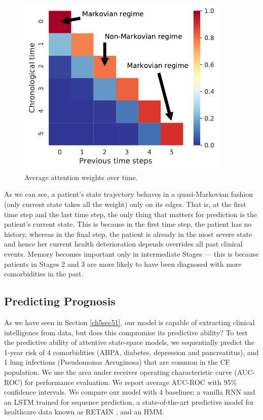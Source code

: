 \documentclass [PhD] {uclathes}
\begin{document}
\begin{figure}
\centering
\includegraphics[width=4in]{ch5Fig6.pdf}
\caption{Average attention weights over time.}
\label{ch5fig6}
\end{figure}

As we can see, a patient's state trajectory behaves in a quasi-Markovian fashion (only current state takes all the weight) only on its edges. That is, at the first time step and the last time step, the only thing that matters for prediction is the patient's current state. This is because in the first time step, the patient has no history, whereas in the final step, the patient is already in the most severe state and hence her current health deterioration depends overrides all past clinical events. Memory becomes important only in intermediate Stages --- this is because patients in Stages 2 and 3 are more likely to have been diagnosed with more comorbidities in the past.

 
\subsection{Predicting Prognosis}
\label{ch5sec52}
As we have seen in Section \ref{ch5sec51}, our model is capable of extracting clinical intelligence from data, but does this compromise its predictive ability? To test the predictive ability of attentive state-space models, we sequentially predict the 1-year risk of 4 comorbidities (ABPA, diabetes, depression and pancreatitus), and 1 lung infections (Pseudomonas Aeruginosa) that are common in the CF population. We use the area under receiver operating characteristic curve (AUC-ROC) for performance evaluation. We report average AUC-ROC with 95$\%$ confidence intervals. We compare our model with 4 baselines: a vanilla RNN and an LSTM trained for sequence prediction, a state-of-the-art predictive model for healthcare data known as RETAIN \cite{kwon2019retainvis,choi2016retain}, and an HMM. 
\end{document}
